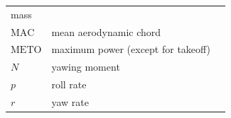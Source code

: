 \documentclass[
]{book}
\begin{document}
\begin{longtable}[]{@{}lll@{}}
\begin{minipage}[t]{0.68\columnwidth}
mass\strut
\end{minipage} & \begin{minipage}[t]{0.10\columnwidth}\raggedright
\strut
\end{minipage}\tabularnewline
\begin{minipage}[t]{0.14\columnwidth}\raggedright
\(\mathrm{MAC}\)\strut
\end{minipage} & \begin{minipage}[t]{0.68\columnwidth}\raggedright
mean aerodynamic chord\strut
\end{minipage} & \begin{minipage}[t]{0.10\columnwidth}\raggedright
\strut
\end{minipage}\tabularnewline
\begin{minipage}[t]{0.14\columnwidth}\raggedright
\(\mathrm{METO}\)\strut
\end{minipage} & \begin{minipage}[t]{0.68\columnwidth}\raggedright
maximum power (except for takeoff)\strut
\end{minipage} & \begin{minipage}[t]{0.10\columnwidth}\raggedright
\strut
\end{minipage}\tabularnewline
\begin{minipage}[t]{0.14\columnwidth}\raggedright
\(N\)\strut
\end{minipage} & \begin{minipage}[t]{0.68\columnwidth}\raggedright
yawing moment\strut
\end{minipage} & \begin{minipage}[t]{0.10\columnwidth}\raggedright
\strut
\end{minipage}\tabularnewline
\begin{minipage}[t]{0.14\columnwidth}\raggedright
\(p\)\strut
\end{minipage} & \begin{minipage}[t]{0.68\columnwidth}\raggedright
roll rate\strut
\end{minipage} & \begin{minipage}[t]{0.10\columnwidth}\raggedright
\strut
\end{minipage}\tabularnewline
\begin{minipage}[t]{0.14\columnwidth}\raggedright
\(r\)\strut
\end{minipage} & \begin{minipage}[t]{0.68\columnwidth}\raggedright
yaw rate\strut
\end{minipage} & \begin{minipage}[t]{0.10\columnwidth}\raggedright

\end{minipage}
\end{longtable}
\end{document}

